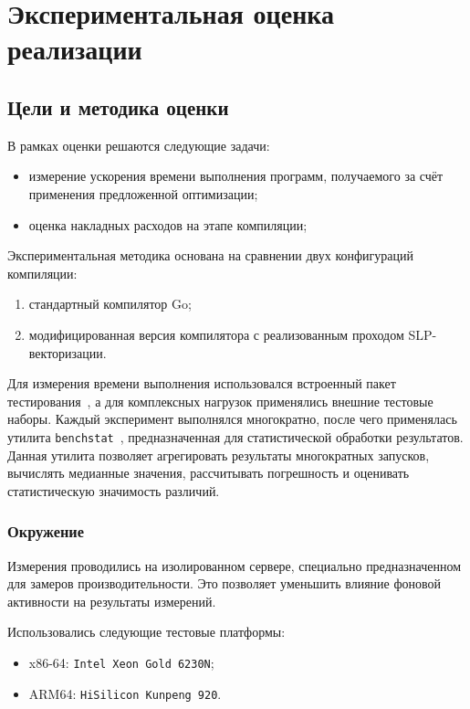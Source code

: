 \section{Экспериментальная оценка реализации}
\label{sec:Chapter7} 

\subsection{Цели и методика оценки}
\label{sec:eval_goals}

В рамках оценки решаются следующие задачи:

\begin{itemize}
    \item измерение ускорения времени выполнения программ, получаемого за счёт применения предложенной оптимизации;
    \item оценка накладных расходов на этапе компиляции;
\end{itemize}

Экспериментальная методика основана на сравнении двух конфигураций компиляции:
\begin{enumerate}
    \item стандартный компилятор Go;
    \item модифицированная версия компилятора с реализованным проходом SLP-векторизации.
\end{enumerate}

Для измерения времени выполнения использовался встроенный пакет тестирования~\cite{go_testing}, 
а для комплексных нагрузок применялись внешние тестовые наборы. 
Каждый эксперимент выполнялся многократно, после чего применялась утилита \texttt{benchstat}~\cite{benchstat}, 
предназначенная для статистической обработки результатов. 
Данная утилита позволяет агрегировать результаты многократных запусков, вычислять медианные значения, 
рассчитывать погрешность и оценивать статистическую значимость различий.

\subsubsection{Окружение}
Измерения проводились на изолированном сервере, специально предназначенном для замеров производительности. 
Это позволяет уменьшить влияние фоновой активности на результаты измерений.

Использовались следующие тестовые платформы:
\begin{itemize}
    \item x86-64: \texttt{Intel Xeon Gold 6230N};
    \item ARM64: \texttt{HiSilicon Kunpeng 920}.
\end{itemize}

